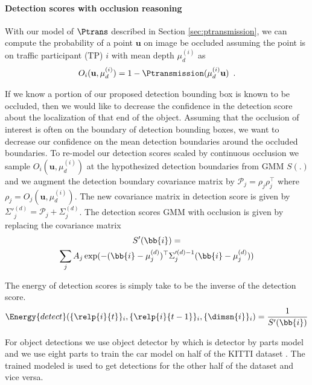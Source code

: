\paragraph{Detection scores with occlusion reasoning} 
\def\u{\mathbf{u}}
With our model of $\Ptrans$ described in Section \ref{sec:ptransmission}, we can
compute the probability of a point $\u$ on image be occluded assuming
the point is on traffic participant (TP) $i$ with mean depth $\mu^{(i)}_d$ as
\begin{align}
  O_{i}(\u, \mu^{(i)}_d) = 1 - \Ptransmission(\mu^{(i)}_d\u) \enspace .
\end{align}

If we know a portion of our proposed detection bounding box is known to be
occluded, then we would like to decrease the confidence in the detection score
about the localization of that end of the object. Assuming that the occlusion of interest
is often on the boundary of detection bounding boxes, we want to decrease our
confidence on the mean detection boundaries around the occluded boundaries.
To re-model our detection scores scaled by continuous occlusion we sample
$O_{i}(\mathbf{u}, \mu^{(i)}_d)$ at the hypothesized detection boundaries from
GMM $S(.)$ and we augment the detection boundary covariance matrix by
$\mathcal{P}_{j} = \rho_{j}\rho_{j}^\top$ where $\rho_{j} = O_{j}(\mathbf{u},
\mu^{(i)}_d)$. The new covariance matrix in detection score is given by 
  $\Sigma'^{(d)}_j = \mathcal{P}_{j} + \Sigma^{(d)}_j$.
The detection scores GMM with occlusion is given by replacing the covariance
matrix
%
\begin{multline}
  S'(\bb{i}) =
  \\
  \sum_j A_j \exp(-(\bb{i}-\mu^{(d)}_j)^\top \Sigma'^{(d)-1}_j
  (\bb{i}-\mu^{(d)}_j))
\end{multline}

The energy of detection scores is simply take to be the inverse of the detection score.
\begin{align}
  \Energy{detect}(\{ \relp{i}{t} \}_i, \{ \relp{i}{t-1} \}_i, \{\dimsn{i}\}_i ) = \frac{1}{S'(\bb{i})}
\end{align}

For object detections we use object detector by \cite{Felzenszwalb_etal_2010}
which is detector by parts model and we use eight parts to train the car model 
on half of the KITTI dataset \cite{geiger2013vision}. The trained modeled is 
used to get detections for the other half of the dataset and vice versa. 

